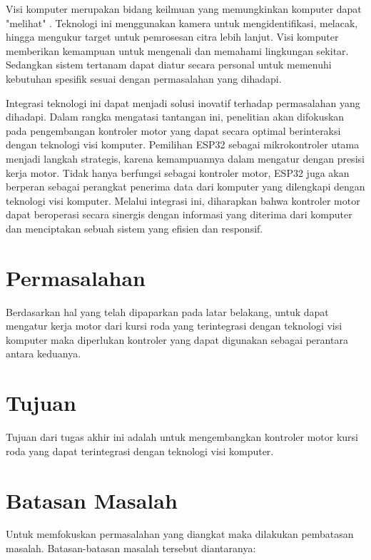 Visi komputer merupakan bidang keilmuan yang memungkinkan komputer dapat "melihat" \parencite{TIAN20201}. Teknologi ini menggunakan kamera untuk mengidentifikasi, melacak, hingga mengukur target untuk pemrosesan citra lebih lanjut. Visi komputer memberikan kemampuan untuk mengenali dan memahami lingkungan sekitar. Sedangkan sistem tertanam dapat diatur secara personal untuk memenuhi kebutuhan spesifik sesuai dengan permasalahan yang dihadapi. 

Integrasi teknologi ini dapat menjadi solusi inovatif terhadap permasalahan yang dihadapi. Dalam rangka mengatasi tantangan ini, penelitian akan difokuskan pada pengembangan kontroler motor yang dapat secara optimal berinteraksi dengan teknologi visi komputer. Pemilihan ESP32 sebagai mikrokontroler utama menjadi langkah strategis, karena kemampuannya dalam mengatur dengan presisi kerja motor. Tidak hanya berfungsi sebagai kontroler motor, ESP32 juga akan berperan sebagai perangkat penerima data dari komputer yang dilengkapi dengan teknologi visi komputer. Melalui integrasi ini, diharapkan bahwa kontroler motor dapat beroperasi secara sinergis dengan informasi yang diterima dari komputer dan menciptakan sebuah sistem yang efisien dan responsif. 
\section{Permasalahan}
\label{sec:permasalahan}

Berdasarkan hal yang telah dipaparkan pada latar belakang, untuk dapat mengatur kerja motor dari kursi roda yang terintegrasi dengan teknologi visi komputer maka diperlukan kontroler yang dapat digunakan sebagai perantara antara keduanya.

\section{Tujuan}
\label{sec:Tujuan}
Tujuan dari tugas akhir ini adalah untuk mengembangkan kontroler motor kursi roda yang dapat terintegrasi dengan teknologi visi komputer.

\section{Batasan Masalah}
\label{sec:batasanmasalah}

Untuk memfokuskan permasalahan yang diangkat maka dilakukan pembatasan masalah. Batasan-batasan masalah tersebut diantaranya:

